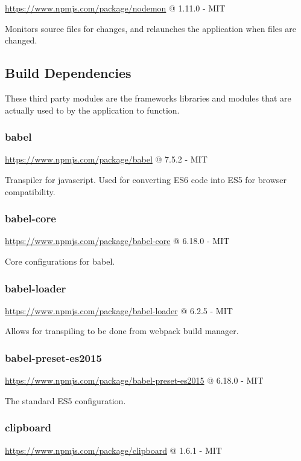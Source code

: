 \url{https://www.npmjs.com/package/nodemon} @ 1.11.0 - MIT

Monitors source files for changes, and relaunches the application when files are changed.

\subsection{Build Dependencies}
These third party modules are the frameworks libraries and modules that are actually used to by the application to function. 

\subsubsection*{babel}

\url{https://www.npmjs.com/package/babel} @ 7.5.2 - MIT

Transpiler for javascript. Used for converting ES6 code into ES5 for browser compatibility.

\subsubsection*{babel-core}

\url{https://www.npmjs.com/package/babel-core} @ 6.18.0 - MIT

Core configurations for babel.


\subsubsection*{babel-loader}

\url{https://www.npmjs.com/package/babel-loader} @ 6.2.5 - MIT

Allows for transpiling to be done from webpack build manager.

\subsubsection*{babel-preset-es2015}

\url{https://www.npmjs.com/package/babel-preset-es2015} @ 6.18.0 - MIT

The standard ES5 configuration.

\subsubsection*{clipboard}

\url{https://www.npmjs.com/package/clipboard} @ 1.6.1 - MIT


